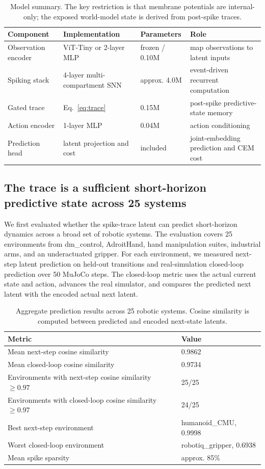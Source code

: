 \documentclass[10pt]{article}
\begin{document}
\begin{table}[t]
\centering
\caption{Model summary. The key restriction is that membrane potentials are internal-only; the exposed world-model state is derived from post-spike traces.}
\label{tab:model_summary}
\small
\begin{tabular}{llll}
\toprule
Component & Implementation & Parameters & Role \\
\midrule
Observation encoder & ViT-Tiny or 2-layer MLP & frozen / 0.10M & map observations to latent inputs \\
Spiking stack & 4-layer multi-compartment SNN & approx. 4.0M & event-driven recurrent computation \\
Gated trace & Eq.~\ref{eq:trace} & 0.15M & post-spike predictive-state memory \\
Action encoder & 1-layer MLP & 0.04M & action conditioning \\
Prediction head & latent projection and cost & included & joint-embedding prediction and CEM cost \\
\bottomrule
\end{tabular}
\end{table}

\subsection{The trace is a sufficient short-horizon predictive state across 25 systems}

We first evaluated whether the spike-trace latent can predict short-horizon dynamics across a broad set of robotic systems. The evaluation covers 25 environments from dm\_control, AdroitHand, hand manipulation suites, industrial arms, and an underactuated gripper. For each environment, we measured next-step latent prediction on held-out transitions and real-simulation closed-loop prediction over 50 MuJoCo steps. The closed-loop metric uses the actual current state and action, advances the real simulator, and compares the predicted next latent with the encoded actual next latent.

\begin{table}[t]
\centering
\caption{Aggregate prediction results across 25 robotic systems. Cosine similarity is computed between predicted and encoded next-state latents.}
\label{tab:aggregate_25}
\begin{tabular}{ll}
\toprule
Metric & Value \\
\midrule
Mean next-step cosine similarity & 0.9862 \\
Mean closed-loop cosine similarity & 0.9734 \\
Environments with next-step cosine similarity $\geq 0.97$ & 25/25 \\
Environments with closed-loop cosine similarity $\geq 0.97$ & 24/25 \\
Best next-step environment & humanoid\_CMU, 0.9998 \\
Worst closed-loop environment & robotiq\_gripper, 0.6938 \\
Mean spike sparsity & approx. 85\% \\
\bottomrule
\end{tabular}
\end{table}
\end{document}
